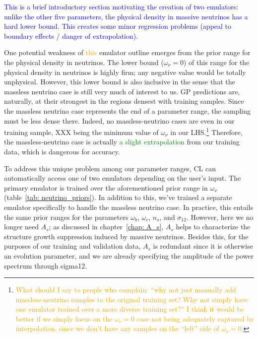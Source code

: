 \textcolor{blue}{This is a brief introductory section motivating the creation 
of two emulators:
unlike the other five parameters, the physical density in massive neutrinos 
has a hard lower bound. This creates some minor regression problems (appeal to 
boundary effects / danger of extrapolation).}

One potential weakness of \textcolor{orange}{this} emulator outline emerges 
from the prior range for the physical density in neutrinos. The lower bound 
($\omega_\nu = 0$) of this range for the physical density in neutrinos is 
highly firm; any negative value would be totally unphysical. However, this 
lower bound is also inclusive in the sense that the massless neutrino case is 
still very much of interest to us. GP predictions are, naturally, at their 
strongest in the regions densest with training samples. Since the massless 
neutrino case represents the end of a parameter range, the sampling must be 
less dense there. Indeed, no massless-neutrino cases are even in our training 
sample, XXX being the minimum value of $\omega_\nu$ in our 
LHS.\footnote{\textcolor{orange}{What should I say to people who complain: 
``why not just manually add massless-neutrino samples to the original training 
set? Why not simply have one emulator trained over a more diverse training 
set?'' I think it would be better if we simply focus on the $\omega_\nu = 0$
case not being adequately captured by interpolation, since we don't have any
samples on the ``left'' side of $\omega_\nu = 0$.}}
Therefore, the massless-neutrino case is actually \textcolor{green}{a slight
extrapolation} from our training data, which is dangerous for accuracy.

To 
address this unique problem among our parameter ranges, CL can automatically 
access one of two emulators depending on the user’s input. The primary 
emulator is trained over the aforementioned prior range in $\omega_\nu$
(table~\ref{tab: neutrino_priors}). In addition to this, we’ve trained a 
separate emulator specifically to handle the massless neutrino case. In 
practice, this entails the same prior ranges for the parameters $\omega_b$, 
$\omega_c$, $n_s$, and $\sigma_{12}$. However, here we no longer need $A_s$;
as discussed in chapter~\ref{chap: A_s}, $A_s$ helps to characterize the
structure growth suppression induced by massive neutrinos. Besides this, for 
the purposes of our training and validation data, $A_s$ is redundant since it
is otherwise an evolution parameter, and we are already specifying the 
amplitude of the power spectrum through sigma12. 

